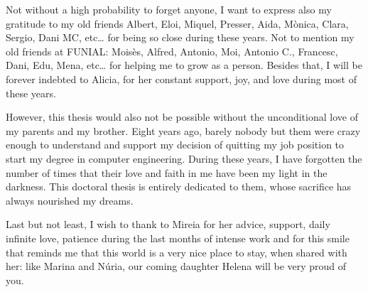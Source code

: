 Not without a high probability to forget anyone, I want to express also my gratitude to my old friends Albert, Eloi, Miquel, Presser, Aida, Mònica, Clara, Sergio, Dani MC, etc… for being so close during these years.  Not to mention my old friends at FUNIAL: Moisès, Alfred, Antonio, Moi, Antonio C., Francesc, Dani, Edu, Mena, etc… for helping me to grow as a person.  Besides that, I will be forever indebted to Alicia, for her constant support, joy, and love during most of these years.   

However, this thesis would also not be possible without the unconditional love of my parents and my brother. Eight years ago, barely nobody but them were crazy enough to understand and support my decision of quitting my job position to start my degree in computer engineering. During these years, I have forgotten the number of times that their love and faith in me have been my light in the darkness. This doctoral thesis is entirely dedicated to them, whose sacrifice has always nourished my dreams.

Last but not least, I wish to thank to Mireia for her advice, support, daily infinite love, patience during the last months of intense work and for this smile that reminds me that this world is a very nice place to stay, when shared with her: like Marina and Núria, our coming daughter Helena will be very proud of you.  

